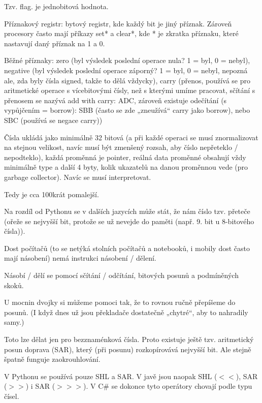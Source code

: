 \documentclass[12pt]{article}					%
\begin{document}

        \begin{definice}[Příznak]
            Tzv. flag. je jednobitová hodnota.

            Příznakový registr: bytový registr, kde každý bit je jiný příznak. Zároveň procesory často mají příkazy set* a clear*, kde * je zkratka příznaku, které nastavují daný příznak na 1 a 0.

            Běžné příznaky: zero (byl výsledek poslední operace nula? 1 = byl, 0 = nebyl), negative (byl výsledek poslední operace záporný? 1 = byl, 0 = nebyl, nepozná ale, zda byly čísla signed, takže to dělá vždycky), carry (přenos, používá se pro aritmetické operace s vícebitovými čísly, než s kterými umíme pracovat, sčítání s přenosem se nazývá add with carry: ADC, zároveň existuje odečítání (s vypůjčením = borrow): SBB (často se zde „zneužívá“ carry jako borrow), nebo SBC (používá se negace carry))
        \end{definice}

        
        \begin{poznamka}
            Čísla ukládá jako minimálně 32 bitová (a při každé operaci se musí znormalizovat na stejnou velikost, navíc musí být zmenšený rozsah, aby číslo nepřeteklo / nepodteklo), každá proměnná je pointer, reálná data proměnné obsahují vždy minimálně type a další 4 byty, kolik ukazatelů na danou proměnnou vede (pro garbage collector). Navíc se musí interpretovat.

            Tedy je cca 100krát pomalejší.
        \end{poznamka}

        \begin{poznamka}
            Na rozdíl od Pythonu se v dalších jazycích může stát, že nám číslo tzv. přeteče (ořeže se nejvyšší bit, protože se už nevejde do paměti (např. 9. bit u 8-bitového čísla)).
        \end{poznamka}

        \begin{poznamka}[Násobení]
            Dost počítačů (to se netýká stolních počítačů a notebooků, i mobily dost často mají násobení) nemá instrukci násobení / dělení.

            Násobí / dělí se pomocí sčítání / odčítání, bitových posunů a podmíněných skoků.

            U mocnin dvojky si můžeme pomoci tak, že to rovnou ručně přepíšeme do posunů. (I když dnes už jsou překladače dostatečně „chytré“, aby to nahradily samy.)
            \begin{upozorneni}
                Toto lze dělat jen pro bezznaménková čísla. Proto existuje ještě tzv. aritmetický posun doprava (SAR), který (při posunu) rozkopírovává nejvyšší bit. Ale stejně špatně funguje zaokrouhlování.

                V Pythonu se používá pouze SHL a SAR. V javě jsou naopak SHL ($<<$), SAR ($>>$) i SAR ($>>>$). V C\# se dokonce tyto operátory chovají podle typu čísel.
            \end{upozorneni}
        \end{poznamka}
\end{document}
